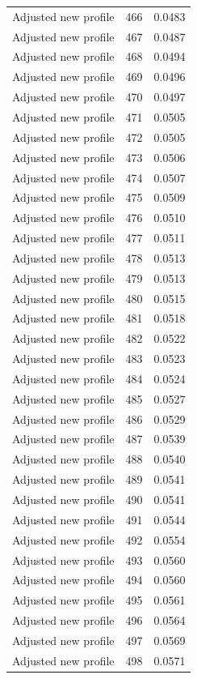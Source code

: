 \begin{table}[htbp]
\begin{tabular}{lll}
Adjusted new profile & 466 & 0.0483 \\
Adjusted new profile & 467 & 0.0487 \\
Adjusted new profile & 468 & 0.0494 \\
Adjusted new profile & 469 & 0.0496 \\
Adjusted new profile & 470 & 0.0497 \\
Adjusted new profile & 471 & 0.0505 \\
Adjusted new profile & 472 & 0.0505 \\
Adjusted new profile & 473 & 0.0506 \\
Adjusted new profile & 474 & 0.0507 \\
Adjusted new profile & 475 & 0.0509 \\
Adjusted new profile & 476 & 0.0510 \\
Adjusted new profile & 477 & 0.0511 \\
Adjusted new profile & 478 & 0.0513 \\
Adjusted new profile & 479 & 0.0513 \\
Adjusted new profile & 480 & 0.0515 \\
Adjusted new profile & 481 & 0.0518 \\
Adjusted new profile & 482 & 0.0522 \\
Adjusted new profile & 483 & 0.0523 \\
Adjusted new profile & 484 & 0.0524 \\
Adjusted new profile & 485 & 0.0527 \\
Adjusted new profile & 486 & 0.0529 \\
Adjusted new profile & 487 & 0.0539 \\
Adjusted new profile & 488 & 0.0540 \\
Adjusted new profile & 489 & 0.0541 \\
Adjusted new profile & 490 & 0.0541 \\
Adjusted new profile & 491 & 0.0544 \\
Adjusted new profile & 492 & 0.0554 \\
Adjusted new profile & 493 & 0.0560 \\
Adjusted new profile & 494 & 0.0560 \\
Adjusted new profile & 495 & 0.0561 \\
Adjusted new profile & 496 & 0.0564 \\
Adjusted new profile & 497 & 0.0569 \\
Adjusted new profile & 498 & 0.0571 \\

\end{tabular}
\end{table}
